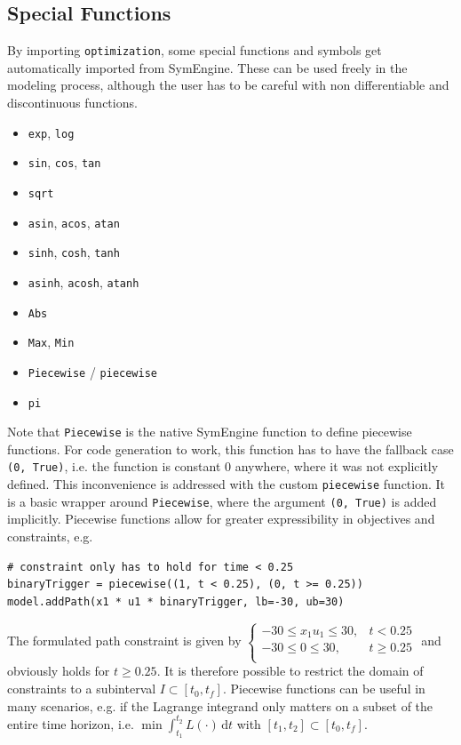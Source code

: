 \documentclass[12pt]{article}
\newcommand{\dd}{\mathrm{d}}
\begin{document}
\subsection{Special Functions}
\label{c:specialFunction}
By importing \texttt{optimization}, some special functions and symbols
get automatically imported from SymEngine. These can be used freely in the
modeling process, although the user has to be careful with non differentiable
and discontinuous functions.
\begin{itemize}
	\item \texttt{exp}, \texttt{log}
	\item \texttt{sin}, \texttt{cos}, \texttt{tan}
	\item \texttt{sqrt}
	\item \texttt{asin}, \texttt{acos}, \texttt{atan}
	\item \texttt{sinh}, \texttt{cosh}, \texttt{tanh}
	\item \texttt{asinh}, \texttt{acosh}, \texttt{atanh}
	\item \texttt{Abs}
	\item \texttt{Max}, \texttt{Min}
	\item \texttt{Piecewise} / \texttt{piecewise}
	\item \texttt{pi}
\end{itemize}

Note that \texttt{Piecewise} is the native SymEngine function to define
piecewise functions. For code generation to work, this function has to have the fallback
case \texttt{(0, True)}, i.e. the function is constant $0$ anywhere, where it
was not explicitly defined. This inconvenience is addressed with the custom
\texttt{piecewise} function. It is a basic wrapper around \texttt{Piecewise},
where the argument \texttt{(0, True)} is added implicitly. Piecewise functions
allow for greater expressibility in objectives and constraints, e.g.

\begin{lstlisting}
# constraint only has to hold for time < 0.25
binaryTrigger = piecewise((1, t < 0.25), (0, t >= 0.25))
model.addPath(x1 * u1 * binaryTrigger, lb=-30, ub=30) 
\end{lstlisting}

The formulated path constraint is given by
$\begin{cases}
		-30 \leq x_1  u_1 \leq 30, & t < 0.25    \\
		-30 \leq 0 \leq 30,        & t \geq 0.25 \\
	\end{cases}$
and obviously holds for $t \geq 0.25$. It is therefore possible to restrict the
domain of constraints to a subinterval $I \subset [t_0, t_f]$. Piecewise
functions can be useful in many scenarios, e.g. if the Lagrange integrand only
matters on a subset of the entire time horizon, i.e. $\min \int_{t_1}^{t_2}
	L(\cdot) \, \dd t$ with $[t_1, t_2] \subset [t_0, t_f]$.
\end{document}
